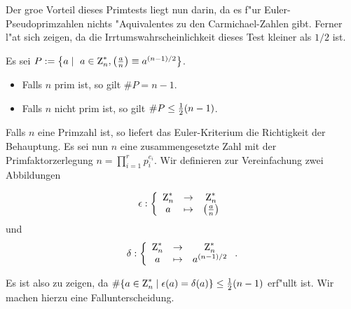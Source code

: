Der gro\3e Vorteil dieses Primtests liegt nun darin, da\3 es f"ur
Euler-Pseudoprimzahlen nichts "Aquivalentes zu den Carmichael-Zahlen
gibt. Ferner l"a\3t sich zeigen, da\3 die Irrtumswahrscheinlichkeit
dieses Test kleiner als $1/2$ ist.

\begin{satz} 
Es sei $P:=\left\{a \mid \ a\in\einheit{n},\leg{a}{n}\equiv
a^{(n-1)/2}\right\}$.
  \begin{itemize}
    \item Falls $n$ prim ist, so gilt $\#P=n-1$.
    \item Falls $n$ nicht prim ist, so gilt $\#P \le {1 \over 2}(n-1)$.
  \end{itemize}
\end{satz}
\beweis 
Falls $n$ eine Primzahl ist, so liefert das Euler-Kriterium die
Richtigkeit der Behauptung. Es sei nun $n$ eine zusammengesetzte Zahl
mit der Primfaktorzerlegung $n=\prod_{i=1}^{r} p_i^{e_i}$. Wir
definieren zur Vereinfachung zwei Abbildungen

\begin{equation}
  \epsilon : \left\{ \begin{array}{ccc}
                      \einheit{n} & \rightarrow & \einheit{n} \\
                      a           & \mapsto         & \leg{a}{n}
                    \end{array} \right.
\end{equation}
und 
\begin{equation}
  \delta   : \left\{ \begin{array}{ccc}
                      \einheit{n} & \rightarrow & \einheit{n} \\
                      a           & \mapsto         & a^{(n-1)/2}
                    \end{array} \right. .
\end{equation}

Es ist also zu zeigen, da\3 $\#\{a\in\einheit{n} \mid \epsilon(a) =
\delta(a)\} \le {1 \over 2}(n-1)$ erf"ullt ist. Wir machen hierzu eine
Fallunterscheidung.

